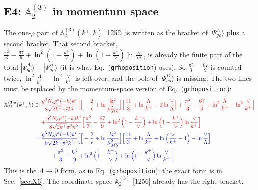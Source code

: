 \documentclass[10pt]{article}
\def\mf#1{\mathbb{#1}}
\def\v#1{\mathbf{#1}}
\newcommand{\old}[1]{{\color{red}#1}}
\newcommand{\new}[1]{{\color{blue}#1}}
\newcommand{\eqn}[1]{Eq.~(\texttt{#1})}
\newcommand{\Pe}{\Big[-\frac{2}{\epsilon}+\ln\frac{\v k^2}{\mu^2_{\overline{MS}}}\Big]}
\begin{document}
\subsection{E4: $\mf A^{(3)}_2$ in momentum space}
The one-$\rho$ part of $\mf A^{(3)}_2(k^+,k)$ [1252] is written as the bracket of $|\Psi^A_{g\rho}\rangle$ plus a second bracket. That second bracket, $\frac{\pi^2}{3}-\frac{67}{9}+\ln^2(1-\frac{k^+}{\vee})+\ln(1-\frac{k^+}{\vee})\ln\frac{\vee}{k^+}$, is already the finite part of the total $|\Psi^A_{g\rho}\rangle+|\Psi^B_{g\rho}\rangle$ (it is what \eqn{grhoposition} uses). So $\frac{\pi^2}{3}-\frac{67}{9}$ is counted twice, $\ln^2\frac{\Lambda}{k^+}-\ln^2\frac{\vee}{k^+}$ is left over, and the pole of $|\Psi^B_{g\rho}\rangle$ is missing. The two lines must be replaced by the momentum-space version of \eqn{grhoposition}:
\begin{align}
\mf A^{(3)a}_{2i}(k^+,k)\supset{}&\old{\frac{g^3N_c\rho^a(-k)k^i}{8\sqrt{2k^+}\pi^2k^2}\Big[\Pe\Big[\frac{11}{3}+\ln\frac{\Lambda}{k^+}-2\ln\frac{\vee}{\Lambda}\Big]+\frac{\pi^2}{3}-\frac{67}{9}+\ln^2\frac{\Lambda}{k^+}-\ln^2\frac{\vee}{k^+}\Big]}\notag\\
&\old{+\frac{g^3N_c\rho^a(-k)k^i}{8\sqrt{2k^+}\pi^2k^2}\Big[\frac{\pi^2}{3}-\frac{67}{9}+\ln^2\Big(1-\frac{k^+}{\vee}\Big)+\ln\Big(1-\frac{k^+}{\vee}\Big)\ln\frac{\vee}{k^+}\Big]}\notag\\
\new{=}{}&\new{\frac{g^3N_c\rho^a(-k)k^i}{8\sqrt{2k^+}\pi^2k^2}\Big[\Pe\Big[\frac{11}{3}+\ln\frac{\Lambda}{k^+}+\ln\Big(\frac{\vee}{k^+}-1\Big)-\ln\frac{\vee}{\Lambda}\Big]}\notag\\
&\qquad\new{+\frac{\pi^2}{3}-\frac{67}{9}+\ln^2\Big(1-\frac{k^+}{\vee}\Big)+\ln\Big(1-\frac{k^+}{\vee}\Big)\ln\frac{\vee}{k^+}\Big]}.
\end{align}
This is the $\Lambda\to0$ form, as in \eqn{grhoposition}; the exact form is in Sec.~\ref{sec:X6}. The coordinate-space $\mf A^{(3)}_2$ [1256] already has the right bracket.
\end{document}
